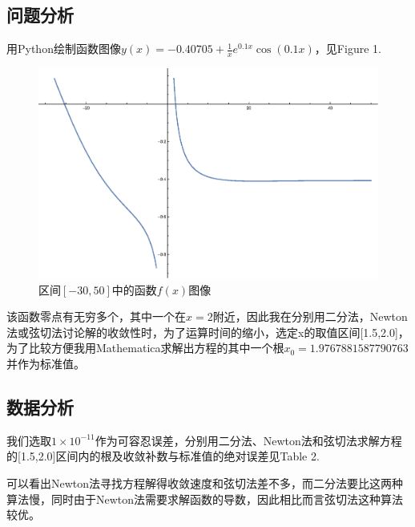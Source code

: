 \documentclass[twoside,twocolumn]{article}
\begin{document}
\begin{CJK*}{UTF8}{gkai}
	\subsection{问题分析}
	用Python绘制函数图像$y(x)=-0.40705+\frac{1}{x}e^{0.1 x}\cos(0.1 x)$，见Figure 1.
	\begin{figure}[h]
		\centering
		\includegraphics[width=0.8\linewidth]{./figure/figure}
		\caption{区间$[-30,50]$中的函数$f(x)$图像}
		\label{fig:figure_2}
	\end{figure}
	
	该函数零点有无穷多个，其中一个在$x=2$附近，因此我在分别用二分法，Newton法或弦切法讨论解的收敛性时，为了运算时间的缩小，选定x的取值区间[1.5,2.0]，为了比较方便我用Mathematica求解出方程的其中一个根$x_{0}=1.9767881587790763$并作为标准值。
	\subsection{数据分析}
	我们选取$1\times 10^{-11}$作为可容忍误差，分别用二分法、Newton法和弦切法求解方程的[1.5,2.0]区间内的根及收敛补数与标准值的绝对误差见Table 2.
	\begin{table}[htbp]
		\centering
		\caption{方程数值解}
			\label{tab:addlabel}
		\end{table}
		可以看出Newton法寻找方程解得收敛速度和弦切法差不多，而二分法要比这两种算法慢，同时由于Newton法需要求解函数的导数，因此相比而言弦切法这种算法较优。


\end{CJK*}
\end{document}
